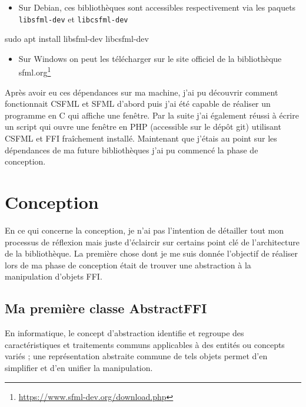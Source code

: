 \documentclass[11pt,a4paper,krantz2,11pt,oneside]{krantz}
\newenvironment{Shaded}{\begin{snugshade}}{\end{snugshade}}
\newcommand{\FunctionTok}[1]{\textcolor[rgb]{0,0,0}{#1}}
\newcommand{\NormalTok}[1]{#1}
\providecommand{\tightlist}{%
  \setlength{\itemsep}{0pt}\setlength{\parskip}{0pt}}
\renewenvironment{quote}{\begin{VF}}{\end{VF}}
\renewcommand{\href}[2]{#2\footnote{\url{#1}}}
\begin{document}
\begin{itemize}
\tightlist
\item
  Sur Debian, ces bibliothèques sont accessibles respectivement via les paquets \texttt{libsfml-dev} et \texttt{libcsfml-dev}
\end{itemize}

\begin{Shaded}
\begin{Highlighting}[]
\FunctionTok{sudo}\NormalTok{ apt install libsfml-dev libcsfml-dev}
\end{Highlighting}
\end{Shaded}

\begin{itemize}
\tightlist
\item
  Sur Windows on peut les télécharger sur le site officiel de la bibliothèque \href{https://www.sfml-dev.org/download.php}{sfml.org}
\end{itemize}

Après avoir eu ces dépendances sur ma machine, j'ai pu découvrir comment fonctionnait CSFML et SFML d'abord puis j'ai été capable de réaliser un programme en C qui affiche une fenêtre. Par la suite j'ai également réussi à écrire un script qui ouvre une fenêtre en PHP (accessible sur le dépôt git) utilisant CSFML et FFI fraîchement installé. Maintenant que j'étais au point sur les dépendances de ma future bibliothèques j'ai pu commencé la phase de conception.

\hypertarget{conception}{%
\section{Conception}\label{conception}}

En ce qui concerne la conception, je n'ai pas l'intention de détailler tout mon processus de réflexion mais juste d'éclaircir sur certains point clé de l'architecture de la bibliothèque. La première chose dont je me suis donnée l'objectif de réaliser lors de ma phase de conception était de trouver une abstraction à la manipulation d'objets FFI.

\hypertarget{ma-premiuxe8re-classe-abstractffi}{%
\subsection{Ma première classe AbstractFFI}\label{ma-premiuxe8re-classe-abstractffi}}

\begin{quote}
En informatique, le concept d'abstraction identifie et regroupe des caractéristiques et traitements communs applicables à des entités ou concepts variés ; une représentation abstraite commune de tels objets permet d'en simplifier et d'en unifier la manipulation.

\end{quote}
\end{document}
